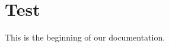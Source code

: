 \documentclass[12pt]{article}
\begin{document}
\section{Test}
This is the beginning of our documentation.
\end{document}
